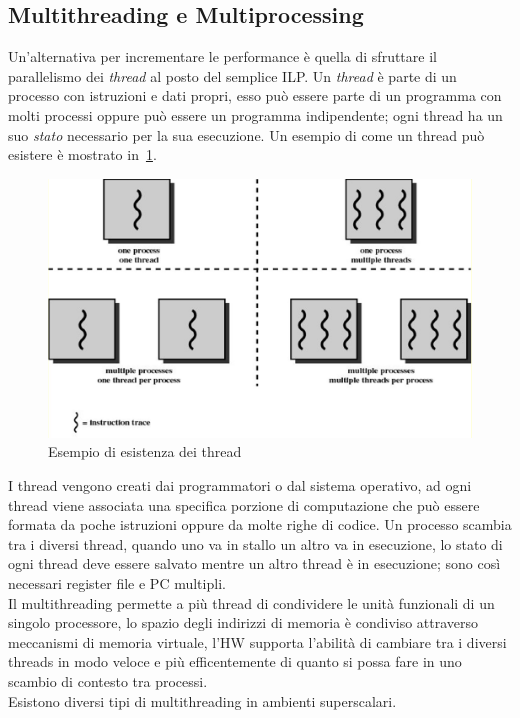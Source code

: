 \subsection{Multithreading e Multiprocessing}
Un'alternativa per incrementare le performance è quella di sfruttare il parallelismo dei \emph{thread} al posto del semplice ILP.
Un \emph{thread} è parte di un processo con istruzioni e dati propri, esso può essere parte di un programma con molti processi oppure può essere un programma indipendente; ogni thread ha un suo \emph{stato} necessario per la sua esecuzione. Un esempio di come un thread può esistere è mostrato in \figurename\,\ref{fig:threadproc}.
\begin{figure}[htb]
\centering
\includegraphics[scale=0.5]{img/threadproc.png}
\caption{Esempio di esistenza dei thread}\label{fig:threadproc}
\end{figure}
I thread vengono creati dai programmatori o dal sistema operativo, ad ogni thread viene associata una specifica porzione di computazione che può essere formata da poche istruzioni oppure da molte righe di codice. Un processo scambia tra i diversi thread, quando uno va in stallo un altro va in esecuzione, lo stato di ogni thread deve essere salvato mentre un altro thread è in esecuzione; sono così necessari register file e PC multipli.\\
Il multithreading permette a più thread di condividere le unità funzionali di un singolo processore, lo spazio degli indirizzi di memoria è condiviso attraverso meccanismi di memoria virtuale, l'HW supporta l'abilità di cambiare tra i diversi threads in modo veloce e più efficentemente di quanto si possa fare in uno scambio di contesto tra processi.\\
Esistono diversi tipi di multithreading in ambienti superscalari.
